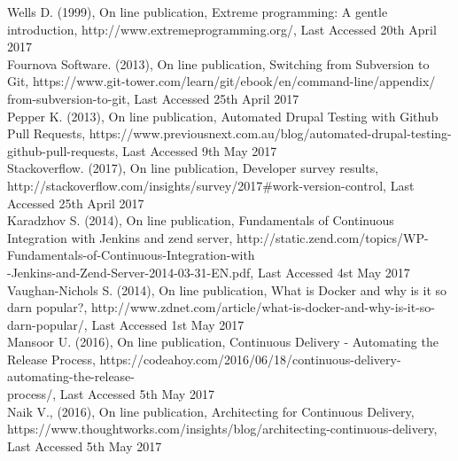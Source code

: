 \begin{thebibliography}{0}


Wells D. (1999), On line publication, Extreme programming: A gentle introduction, http://www.extremeprogramming.org/, Last Accessed 20th April 2017
\\
Fournova Software. (2013), On line publication, Switching from Subversion to Git, https://www.git-tower.com/learn/git/ebook/en/command-line/appendix/\\from-subversion-to-git, Last Accessed 25th April 2017
\\
Pepper K. (2013), On line publication, Automated Drupal Testing with Github Pull Requests, https://www.previousnext.com.au/blog/automated-drupal-testing-github-pull-requests, Last Accessed 9th May 2017
\\
Stackoverflow. (2017), On line publication, Developer survey results, http://stackoverflow.com/insights/survey/2017\#work-version-control, Last Accessed 25th April 2017
\\
Karadzhov S. (2014), On line publication, Fundamentals of Continuous Integration with Jenkins and zend server, http://static.zend.com/topics/WP-Fundamentals-of-Continuous-Integration-with\\
-Jenkins-and-Zend-Server-2014-03-31-EN.pdf, Last Accessed 4st May 2017
\\
Vaughan-Nichols S. (2014), On line publication, What is Docker and why is it so darn popular?, http://www.zdnet.com/article/what-is-docker-and-why-is-it-so-darn-popular/, Last Accessed 1st May 2017
\\
Mansoor U. (2016), On line publication, Continuous Delivery - Automating the Release Process, https://codeahoy.com/2016/06/18/continuous-delivery-automating-the-release-\\process/, Last Accessed 5th May 2017
\\
Naik V., (2016), On line publication, Architecting for Continuous Delivery, https://www.thoughtworks.com/insights/blog/architecting-continuous-delivery, Last Accessed 5th May 2017

\end{thebibliography}